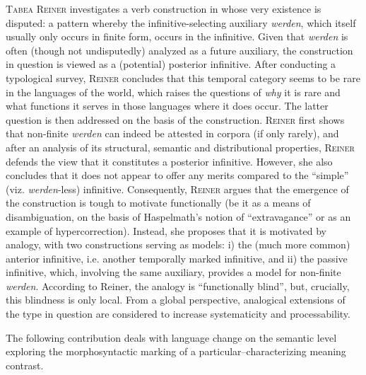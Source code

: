\documentclass[output=paper,colorlinks,citecolor=brown]{langscibook}
\begin{document}
\textsc{Tabea Reiner} investigates a verb construction in  whose very existence is disputed: a pattern whereby the infinitive-selecting auxiliary \textit{werden}, which itself usually only occurs in finite form, occurs in the infinitive. Given that \textit{werden} is often (though not undisputedly) analyzed as a future auxiliary, the construction in question is viewed as a (potential) posterior infinitive. After conducting a typological survey, \textsc{Reiner} concludes that this temporal category seems to be rare in the languages of the world, which raises the questions of \textit{why} it is rare and what functions it serves in those languages where it does occur. The latter question is then addressed on the basis of the  construction. \textsc{Reiner} first shows that non-finite \textit{werden} can indeed be attested in corpora (if only rarely), and after an analysis of its structural, semantic and distributional properties, \textsc{Reiner} defends the view that it constitutes a posterior infinitive. However, she also concludes that it does not appear to offer any merits compared to the ``simple'' (viz. \textit{werden}-less) infinitive. Consequently, \textsc{Reiner} argues that the emergence of the construction is tough to motivate functionally (be it as a means of disambiguation, on the basis of Haspelmath's \citeyear{Haspelmath_1999} notion of ``extravagance'' or as an example of hypercorrection). Instead, she proposes that it is motivated by analogy, with two constructions serving as models: i) the (much more common) anterior infinitive, i.e. another temporally marked infinitive, and ii) the passive infinitive, which, involving the same auxiliary, provides a model for non-finite \textit{werden}. According to Reiner, the analogy is ``functionally blind'', but, crucially, this blindness is only local. From a global perspective, analogical extensions of the type in question are considered to increase systematicity and processability.

The following contribution deals with language change on the semantic level exploring
the morphosyntactic marking of a particular–characterizing meaning contrast.
\end{document}

